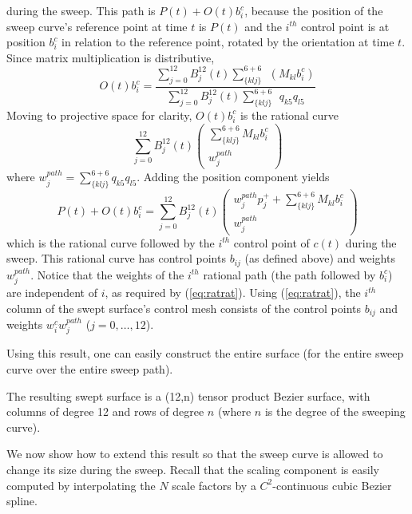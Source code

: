 during the sweep.
This path is $P(t) + O(t)b_i^{c}$, because the position of the sweep
curve's reference point at time $t$ is $P(t)$ and the $i^{th}$ control
point is at position $b_i^c$ in relation to the reference point, rotated
by the orientation at time $t$.
Since matrix multiplication is distributive,
\[
	O(t)b_i^{c} = 
\frac{\sum_{j=0}^{12} B_j^{12}(t) \sum_{\{klj\}}^{6+6}
	\ \ (M_{kl} b_i^{c}) }
     {\sum_{j=0}^{12} B_j^{12}(t) \sum_{\{klj\}}^{6+6} 
	\ \ q_{k5}q_{l5}}
\]
Moving to projective space for clarity, 
$O(t)b_i^{c}$ is the rational curve
\[
	\sum_{j=0}^{12} B_j^{12}(t) 
	\left(	\begin{array}{c}
	\sum_{\{klj\}}^{6+6} M_{kl} b_i^{c} \\ w_j^{path}
	\end{array} \right)
\]
where $w_j^{path} = \sum_{\{klj\}}^{6+6} q_{k5} q_{l5}$.
Adding the position component yields
\[
P(t) + O(t)b_i^{c} = 
	\sum_{j=0}^{12} B_j^{12}(t) 
	\left(	\begin{array}{c}
	w_j^{path} p_j^{+} + \sum_{\{klj\}}^{6+6} M_{kl} b_i^{c} \\ 
	w_j^{path}
	\end{array} \right)
\]
which is the rational curve followed by the $i^{th}$ control point
of $c(t)$ during the sweep.
This rational curve has control points $b_{ij}$ (as defined above)
and weights $w_j^{path}$.
Notice that the weights of the $i^{th}$ rational path 
(the path followed by $b_i^c$) are 
independent of $i$, as required by (\ref{eq:ratrat}).
Using (\ref{eq:ratrat}), 
the $i^{th}$ column of the swept surface's control mesh consists
of the control points $b_{ij}$
and weights $w_i^{c} w_j^{path}$ ($j=0,\ldots,12$).
\QED

Using this result, one can easily construct the entire surface
(for the entire sweep curve over the entire sweep path).

\begin{corollary}
The resulting swept surface is a (12,n) tensor product Bezier surface,
with columns of degree 12 and rows of degree $n$
(where $n$ is the degree of the sweeping curve).
\end{corollary}

We now show how to extend this result so that the sweep curve
is allowed to change its size during the sweep.
Recall that the scaling component is easily computed by interpolating the
$N$ scale factors by a $C^2$-continuous cubic Bezier spline.

